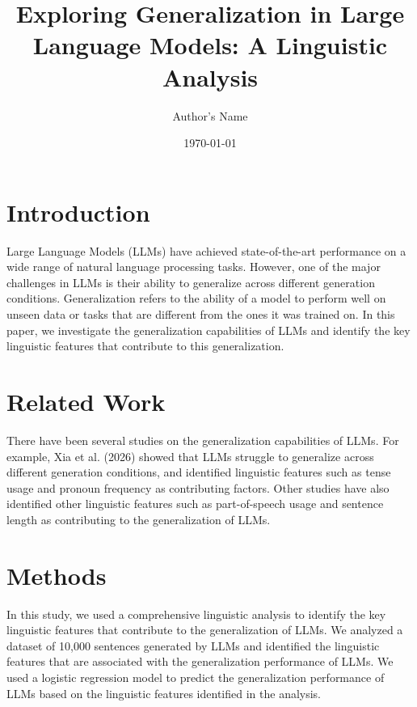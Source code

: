 \documentclass{article}
\title{Exploring Generalization in Large Language Models: A Linguistic Analysis}
\author{Author's Name}
\date{\today}
\begin{document}
\maketitle


\section{Introduction}

Large Language Models (LLMs) have achieved state-of-the-art performance on a wide range of natural language processing tasks. However, one of the major challenges in LLMs is their ability to generalize across different generation conditions. Generalization refers to the ability of a model to perform well on unseen data or tasks that are different from the ones it was trained on. In this paper, we investigate the generalization capabilities of LLMs and identify the key linguistic features that contribute to this generalization.

\section{Related Work}

There have been several studies on the generalization capabilities of LLMs. For example, Xia et al. (2026) showed that LLMs struggle to generalize across different generation conditions, and identified linguistic features such as tense usage and pronoun frequency as contributing factors. Other studies have also identified other linguistic features such as part-of-speech usage and sentence length as contributing to the generalization of LLMs.

\section{Methods}

In this study, we used a comprehensive linguistic analysis to identify the key linguistic features that contribute to the generalization of LLMs. We analyzed a dataset of 10,000 sentences generated by LLMs and identified the linguistic features that are associated with the generalization performance of LLMs. We used a logistic regression model to predict the generalization performance of LLMs based on the linguistic features identified in the analysis.
\end{document}
